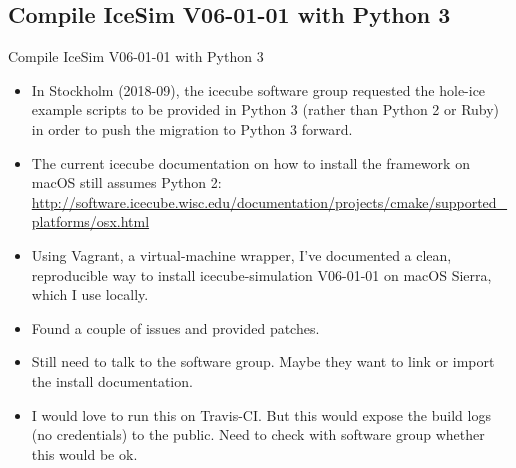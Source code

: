 \subsection{\done Compile IceSim V06-01-01 with Python 3}
\begin{frame}{\done Compile IceSim V06-01-01 with Python 3}
  \begin{itemize}
    \item In Stockholm (2018-09), the icecube software group requested the hole-ice example scripts to be provided in Python 3 (rather than Python 2 or Ruby) in order to push the migration to Python 3 forward.
    \item The current icecube documentation on how to install the framework on macOS still assumes Python 2: \url{http://software.icecube.wisc.edu/documentation/projects/cmake/supported_platforms/osx.html}
    \item[\done] Using Vagrant, a virtual-machine wrapper, I've documented a clean, reproducible way to install icecube-simulation V06-01-01 on macOS Sierra, which I use locally.
    \item[\done] Found a couple of issues and provided patches.
    \item[\tobedone] Still need to talk to the software group. Maybe they want to link or import the install  documentation.
    \item[\tobedone] I would love to run this on Travis-CI. But this would expose the build logs (no credentials) to the public. Need to check with software group whether this would be ok.
  \end{itemize}

  \bigskip {} \bigskip
\end{frame}

